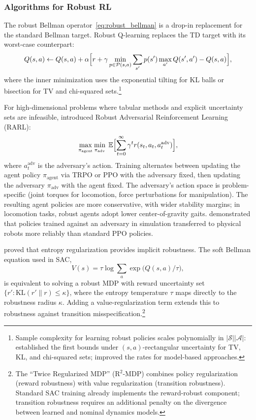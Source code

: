 \subsubsection{Algorithms for Robust RL}
\label{subsubsec:robust_algorithms}

The robust Bellman operator~\eqref{eq:robust_bellman} is a drop-in
replacement for the standard Bellman target. Robust Q-learning replaces
the TD target with its worst-case counterpart:
\begin{equation}
  Q(s,a) \leftarrow Q(s,a) + \alpha\Bigl[
    r + \gamma \min_{p \in \mathcal{P}(s,a)} \sum_{s'} p(s')
    \max_{a'} Q(s',a') - Q(s,a)
  \Bigr],
  \label{eq:robust_q_learning}
\end{equation}
where the inner minimization uses the exponential tilting for KL balls or
bisection for TV and chi-squared
sets.\footnote{Sample complexity for learning robust policies scales
polynomially in $|\mathcal{S}||\mathcal{A}|$: \citet{Panaganti2022}
established the first bounds under $(s,a)$-rectangular uncertainty for TV,
KL, and chi-squared sets; \citet{clavier2024robust} improved the rates for
model-based approaches.}

For high-dimensional problems where tabular methods and explicit
uncertainty sets are infeasible, \citet{Pinto2017} introduced Robust
Adversarial Reinforcement Learning (RARL):
\begin{equation}
  \max_{\pi_{\text{agent}}} \min_{\pi_{\text{adv}}} \;
  \mathbb{E}\Bigl[\sum_{t=0}^\infty \gamma^t
    r(s_t, a_t, a_t^{\text{adv}})
  \Bigr],
  \label{eq:rarl}
\end{equation}
where $a_t^{\text{adv}}$ is the adversary's action. Training alternates
between updating the agent policy $\pi_{\text{agent}}$ via TRPO or PPO
with the adversary fixed, then updating the adversary
$\pi_{\text{adv}}$ with the agent fixed. The adversary's action space is
problem-specific (joint torques for locomotion, force perturbations for
manipulation). The resulting agent policies are more conservative, with
wider stability margins; in locomotion tasks, robust agents adopt lower
center-of-gravity gaits. \citet{Pinto2017} demonstrated that policies
trained against an adversary in simulation transferred to physical robots
more reliably than standard PPO policies.

\citet{Derman2021} proved that entropy regularization provides implicit
robustness. The soft Bellman equation used in SAC,
\begin{equation}
  V(s) = \tau \log \sum_a \exp\bigl(Q(s,a)/\tau\bigr),
  \label{eq:soft_bellman}
\end{equation}
is equivalent to solving a robust MDP with reward uncertainty set
$\{r' : \text{KL}(r' \| r) \leq \kappa\}$, where the entropy temperature
$\tau$ maps directly to the robustness radius $\kappa$. Adding a
value-regularization term extends this to robustness against transition
misspecification.\footnote{The ``Twice Regularized MDP'' (R$^2$-MDP)
combines policy regularization (reward robustness) with value
regularization (transition robustness). Standard SAC training already
implements the reward-robust component; transition robustness requires an
additional penalty on the divergence between learned and nominal dynamics
models.}

